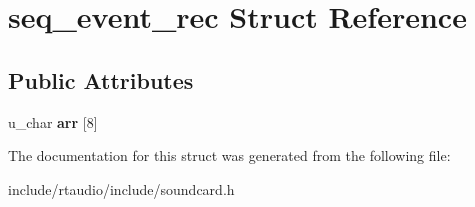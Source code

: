 \hypertarget{structseq__event__rec}{}\section{seq\+\_\+event\+\_\+rec Struct Reference}
\label{structseq__event__rec}
\subsection*{Public Attributes}
\begin{DoxyCompactItemize}
\item 
u\+\_\+char {\bfseries arr} \mbox{[}8\mbox{]}\hypertarget{structseq__event__rec_af85d0e450ab6850e5d18701bd146c99f}{}\label{structseq__event__rec_af85d0e450ab6850e5d18701bd146c99f}

\end{DoxyCompactItemize}


The documentation for this struct was generated from the following file\+:\begin{DoxyCompactItemize}
\item 
include/rtaudio/include/soundcard.\+h\end{DoxyCompactItemize}
